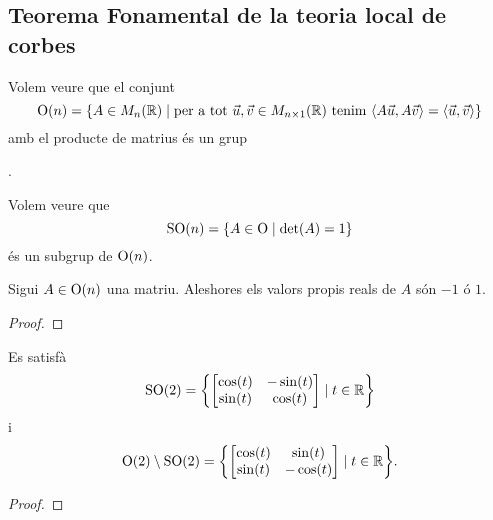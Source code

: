 \documentclass[../Apunts.tex]{subfiles}
\begin{document}
	\subsection{Teorema Fonamental de la teoria local de corbes}
	\begin{example}
		\label{ex:grup ortogonal}
		Volem veure que el conjunt
		\[\GrupOrtogonal(n)=\{A\in\matrius_{n}(\mathbb{R})\mid\text{per a tot }\vec{u},\vec{v}\in\matrius_{n\times1}(\mathbb{R})\text{ tenim }\prodesc{A\vec{u}}{A\vec{v}}=\prodesc{\vec{u}}{\vec{v}}\}\]
		amb el producte de matrius és un grup
	\end{example}.
	\begin{solution}
	\end{solution}
	\begin{example}
		\label{ex:grup especial ortogonal}
		Volem veure que
		\[\mathrm{SO}(n)=\{A\in\mathrm{O}\mid\det(A)=1\}\]
		és un subgrup de \(\mathrm{O}(n)\).
	\end{example}
	\begin{solution}
	\end{solution}
	\begin{proposition}
		\label{prop:els valors propis d'una matriu ortogonal són -1 o 1}
		Sigui \(A\in\mathrm{O}(n)\) una matriu. Aleshores els valors propis reals de \(A\) són \(-1\) ó \(1\).
	\end{proposition}
	\begin{proof}
	\end{proof}
	\begin{proposition}
		\label{prop:caracterització de les matrius ortogonals 2x2}
		Es satisfà
		\[\GrupEspecialOrtogonal(2)=\left\{\begin{bmatrix}
			\cos(t) & -\sin(t) \\
			\sin(t) & \cos(t)
		\end{bmatrix}\mid t\in\mathbb{R}\right\}\]
		i
		\[\GrupOrtogonal(2)\setminus\GrupEspecialOrtogonal(2)=\left\{\begin{bmatrix}
			\cos(t) & \sin(t) \\
			\sin(t) & -\cos(t)
		\end{bmatrix}\mid t\in\mathbb{R}\right\}.\]
	\end{proposition}
	\begin{proof}
	\end{proof}
\end{document}
